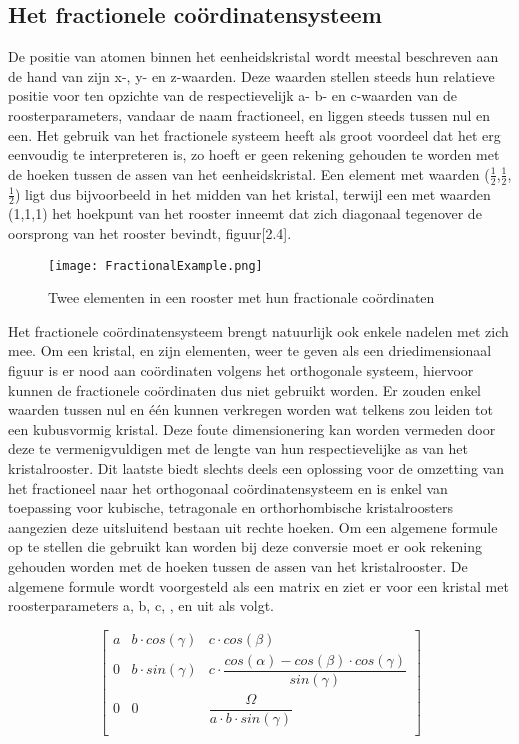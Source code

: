 \subsection{Het fractionele coördinatensysteem}
De positie van atomen binnen het eenheidskristal wordt meestal beschreven aan de hand van zijn x-, y- en z-waarden. Deze waarden stellen steeds hun relatieve positie voor ten opzichte van de respectievelijk a- b- en c-waarden van de roosterparameters, vandaar de naam fractioneel, en liggen steeds tussen nul en een. Het gebruik van het fractionele systeem heeft als groot voordeel dat het erg eenvoudig te interpreteren is, zo hoeft er geen rekening gehouden te worden met de hoeken tussen de assen van het eenheidskristal. Een element met waarden ($\frac{1}{2}$,$\frac{1}{2}$,$\frac{1}{2}$) ligt dus bijvoorbeeld in het midden van het kristal, terwijl een met waarden (1,1,1) het hoekpunt van het rooster inneemt dat zich diagonaal tegenover de oorsprong van het rooster bevindt, figuur[2.4].
\par
\begin{figure}[H]
\texttt{[image: FractionalExample.png]}
\caption{Twee elementen in een rooster met hun fractionale coördinaten}
\end{figure}
\par
Het fractionele coördinatensysteem brengt natuurlijk ook enkele nadelen met zich mee. Om een kristal, en zijn elementen, weer te geven als een driedimensionaal figuur is er nood aan coördinaten volgens het orthogonale systeem, hiervoor kunnen de fractionele coördinaten dus niet gebruikt worden. Er zouden enkel waarden tussen nul en één kunnen verkregen worden wat telkens zou leiden tot een kubusvormig kristal. Deze foute dimensionering kan worden vermeden door deze te vermenigvuldigen met de lengte van hun respectievelijke as van het kristalrooster. Dit laatste biedt slechts deels een oplossing voor de omzetting van het fractioneel naar het orthogonaal coördinatensysteem en is enkel van toepassing voor kubische, tetragonale en orthorhombische kristalroosters aangezien deze uitsluitend bestaan uit rechte hoeken. Om een algemene formule op te stellen die gebruikt kan worden bij deze conversie moet er ook rekening gehouden worden met de hoeken tussen de assen van het kristalrooster. De algemene formule wordt voorgesteld als een matrix en ziet er voor een kristal met roosterparameters a, b, c, \textalpha, \textbeta{} en \textgamma{} uit als volgt. 
\par
\[
\begin{bmatrix}
    a & b \cdot cos(\gamma) & c \cdot cos(\beta) \\
    0 & b \cdot sin(\gamma) & c \cdot \dfrac{cos(\alpha)-cos(\beta) \cdot cos(\gamma)}{sin(\gamma)}  \\
    0 & 0 & \dfrac{\Omega}{a \cdot b \cdot sin(\gamma)}\\
\end{bmatrix}
\]
